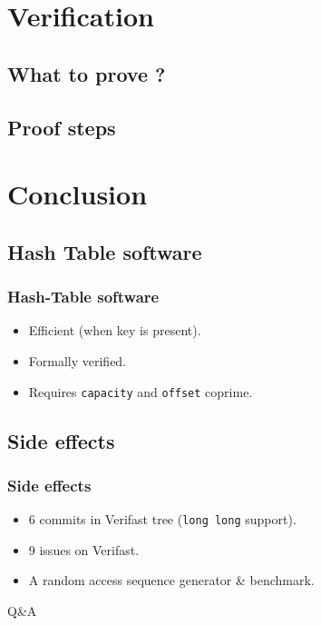\documentclass{beamer}
\begin{document}
\section{Verification}
\subsection{What to prove ?}
\subsection{Proof steps}


\section{Conclusion}
\subsection{Hash Table software}
\begin{frame}
	\frametitle{Hash-Table software}
	\begin{itemize}
		\item Efficient (when key is present).
		\item Formally verified.
		\item Requires \texttt{capacity} and \texttt{offset} coprime.
	\end{itemize}
\end{frame}

\subsection{Side effects}
\begin{frame}
	\frametitle{Side effects}
	\begin{itemize}
		\item 6 commits in Verifast tree (\texttt{long long} support).
		\item 9 issues on Verifast.
		\item A random access sequence generator \& benchmark.
	\end{itemize}
\end{frame}



\begin{frame}
\begin{center}
\huge{Q\&A}
\end{center}
\end{frame}
\end{document}
